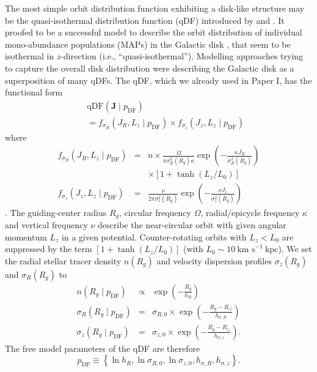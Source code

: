 \documentclass[iop,revtex4,numberedappendix,appendixfloats]{emulateapj}
\newcommand{\vect}[1]{\boldsymbol{#1}}
\begin{document}
The most simple orbit distribution function exhibiting a disk-like structure may be the quasi-isothermal distribution function (qDF) introduced by \citet{2010MNRAS.401.2318B} and \citet{2011MNRAS.413.1889B}. It  proofed to be a successful model to describe the orbit distribution of individual mono-abundance populations (MAPs) in the Galactic disk \citep{2013ApJ...779..115B,2013MNRAS.434..652T}, that seem to be isothermal in $z$-direction (i.e., ``quasi-isothermal''). Modelling approaches trying to capture the overall disk distribution \citep{2014MNRAS.445.3133P,2015MNRAS.449.3479S} were describing the Galactic disk as a superposition of many qDFs. The qDF, which we already used in Paper I, has the functional form
\begin{eqnarray}
&&\text{qDF}(\vect{J} \mid p_\text{DF}) \nonumber\\
&&= f_{\sigma_R}\left(J_R,L_z \mid p_\text{DF}\right) \times f_{\sigma_z}\left(J_z,L_z \mid p_\text{DF}\right)\label{eq:df_general}\end{eqnarray}
where
\begin{eqnarray}
f_{\sigma_R}\left(J_R,L_z \mid p_\text{DF}\right) &=& n \times \frac{\Omega}{\pi\sigma_R^2(R_g) \kappa}\exp\left(-\frac{\kappa J_R}{\sigma_R^2(R_g)} \right) \nonumber\\
&& \times \left[1+\tanh\left(L_z/L_0\right) \right]\\
f_{\sigma_z}\left(J_z,L_z \mid p_\text{DF} \right) &=& \frac{\nu}{2 \pi \sigma_z^2(R_g)} \exp\left( -\frac{\nu J_z}{\sigma_z^2(R_g)} \right)
\end{eqnarray}
\citep{2011MNRAS.413.1889B}. The guiding-center radius $R_g$, circular frequency $\Omega$, radial/epicycle frequency $\kappa$ and vertical frequency $\nu$ describe the near-circular orbit with given angular momentum $L_z$ in a given potential. Counter-rotating orbits with $L_z < L_0$ are suppressed by the term $\left[1+\tanh\left(L_z/L_0\right) \right]$ (with $L_0 \sim 10~\text{km s}^{-1}~ \text{kpc}$). 
We set the radial stellar tracer density $n(R_g)$ and velocity dispersion profiles $\sigma_z(R_g)$ and $\sigma_R(R_g)$ to
\begin{eqnarray}
n(R_g \mid p_\text{DF}) &\propto& \exp\left(-\frac{R_g}{h_R} \right)\\
\sigma_R(R_g \mid p_\text{DF}) &=& \sigma_{R,0} \times \exp\left(- \frac{R_g-R_\odot}{h_{\sigma,R}} \right)\label{eq:sigmaRRg}\\
\sigma_z(R_g \mid p_\text{DF}) &=& \sigma_{z,0} \times \exp\left(- \frac{R_g-R_\odot}{h_{\sigma,z}} \right)\label{eq:sigmazRg}.
\end{eqnarray}
The free model parameters of the qDF are therefore
\begin{equation*}
p_\text{DF} \equiv \left\{ \ln h_R, \ln \sigma_{R,0}, \ln \sigma_{z,0}, h_{\sigma,R}, h_{\sigma,z}\right\}.
\end{equation*}
\end{document}

